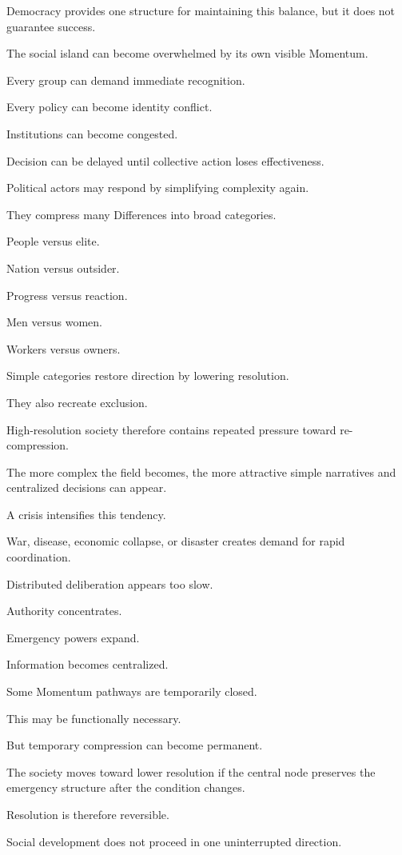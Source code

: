 Democracy provides one structure for maintaining this balance, but it does not guarantee success.

The social island can become overwhelmed by its own visible Momentum.

Every group can demand immediate recognition.

Every policy can become identity conflict.

Institutions can become congested.

Decision can be delayed until collective action loses effectiveness.

Political actors may respond by simplifying complexity again.

They compress many Differences into broad categories.

People versus elite.

Nation versus outsider.

Progress versus reaction.

Men versus women.

Workers versus owners.

Simple categories restore direction by lowering resolution.

They also recreate exclusion.

High-resolution society therefore contains repeated pressure toward re-compression.

The more complex the field becomes, the more attractive simple narratives and centralized decisions can appear.

A crisis intensifies this tendency.

War, disease, economic collapse, or disaster creates demand for rapid coordination.

Distributed deliberation appears too slow.

Authority concentrates.

Emergency powers expand.

Information becomes centralized.

Some Momentum pathways are temporarily closed.

This may be functionally necessary.

But temporary compression can become permanent.

The society moves toward lower resolution if the central node preserves the emergency structure after the condition changes.

Resolution is therefore reversible.

Social development does not proceed in one uninterrupted direction.

